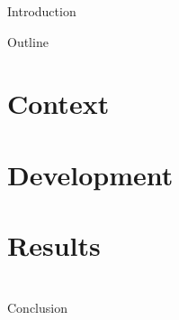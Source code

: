 \documentclass{beamer}
\makeatletter
\def\beamer@writeslidentry@miniframesoff{%
  \expandafter\beamer@ifempty\expandafter{\beamer@framestartpage}{}%
  {%
    \clearpage\beamer@notesactions%
  }
}
\newcommand*{\miniframesoff}{\let\beamer@writeslidentry=\beamer@writeslidentry@miniframesoff}
\makeatother
\begin{document}
    \begin{frame}
        \titlepage
    \end{frame}

    \begin{frame}{Introduction}

    \end{frame}

    \begin{frame}{Outline}
        \tableofcontents[pausesections]
    \end{frame}

    \section{Context}
    \section{Development}
    \section{Results}
    \frame{}
    \miniframesoff
        \section{}
    \begin{frame}{Conclusion}

    \end{frame}
\end{document}
